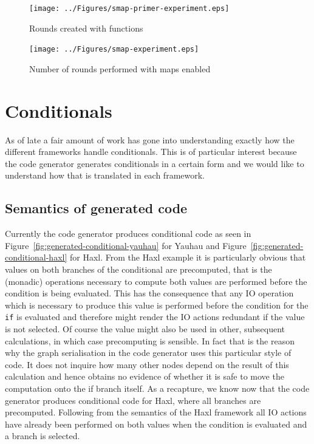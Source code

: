 \begin{figure}
    \texttt{[image: ../Figures/smap-primer-experiment.eps]}
    \caption{Rounds created with functions}
    \label{fig:smap-experiment-primer}
\end{figure}

\begin{figure}
    \texttt{[image: ../Figures/smap-experiment.eps]}
    \caption{Number of rounds performed with maps enabled}
    \label{fig:smap-experiment}
\end{figure}

\section{Conditionals}


As of late a fair amount of work has gone into understanding exactly how the different frameworks handle conditionals.
This is of particular interest because the code generator generates conditionals in a certain form and we would like to understand how that is translated in each framework.

\subsection{Semantics of generated code}

Currently the code generator produces conditional code as seen in Figure~\ref{fig:generated-conditional-yauhau} for Yauhau and Figure~\ref{fig:generated-conditional-haxl} for Haxl.
From the Haxl example it is particularly obvious that values on both branches of the conditional are precomputed, that is the (monadic) operations necessary to compute both values are performed before the condition is being evaluated.
This has the consequence that any IO operation which is necessary to produce this value is performed before the condition for the \texttt{if} is evaluated and therefore might render the IO actions redundant if the value is not selected.
Of course the value might also be used in other, subsequent calculations, in which case precomputing is sensible.
In fact that is the reason why the graph serialisation in the code generator uses this particular style of code.
It does not inquire how many other nodes depend on the result of this calculation and hence obtains no evidence of whether it is safe to move the computation onto the if branch itself.
As a recapture, we know now that the code generator produces conditional code for Haxl, where all branches are precomputed.
Following from the semantics of the Haxl framework all IO actions have already been performed on both values when the condition is evaluated and a branch is selected.

